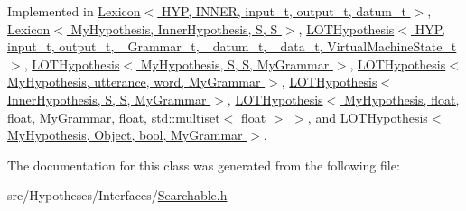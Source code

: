 Implemented in \hyperlink{class_lexicon_a6419f323377d4c524363707eee0cae09}{Lexicon$<$ H\+Y\+P, I\+N\+N\+E\+R, input\+\_\+t, output\+\_\+t, datum\+\_\+t $>$}, \hyperlink{class_lexicon_a6419f323377d4c524363707eee0cae09}{Lexicon$<$ My\+Hypothesis, Inner\+Hypothesis, S, S $>$}, \hyperlink{class_l_o_t_hypothesis_a097cde606ec3f277fdeb92145599027f}{L\+O\+T\+Hypothesis$<$ H\+Y\+P, input\+\_\+t, output\+\_\+t, \+\_\+\+Grammar\+\_\+t, \+\_\+datum\+\_\+t, \+\_\+data\+\_\+t, Virtual\+Machine\+State\+\_\+t $>$}, \hyperlink{class_l_o_t_hypothesis_a097cde606ec3f277fdeb92145599027f}{L\+O\+T\+Hypothesis$<$ My\+Hypothesis, S, S, My\+Grammar $>$}, \hyperlink{class_l_o_t_hypothesis_a097cde606ec3f277fdeb92145599027f}{L\+O\+T\+Hypothesis$<$ My\+Hypothesis, utterance, word, My\+Grammar $>$}, \hyperlink{class_l_o_t_hypothesis_a097cde606ec3f277fdeb92145599027f}{L\+O\+T\+Hypothesis$<$ Inner\+Hypothesis, S, S, My\+Grammar $>$}, \hyperlink{class_l_o_t_hypothesis_a097cde606ec3f277fdeb92145599027f}{L\+O\+T\+Hypothesis$<$ My\+Hypothesis, float, float, My\+Grammar, float, std\+::multiset$<$ float $>$ $>$}, and \hyperlink{class_l_o_t_hypothesis_a097cde606ec3f277fdeb92145599027f}{L\+O\+T\+Hypothesis$<$ My\+Hypothesis, Object, bool, My\+Grammar $>$}.



The documentation for this class was generated from the following file\+:\begin{DoxyCompactItemize}
\item 
src/\+Hypotheses/\+Interfaces/\hyperlink{_searchable_8h}{Searchable.\+h}\end{DoxyCompactItemize}
